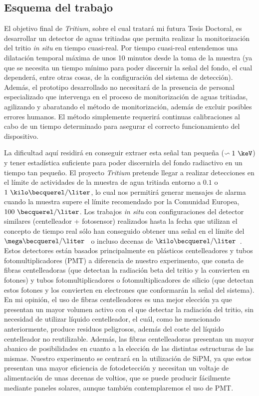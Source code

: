 \subsection{Esquema del trabajo}

El objetivo final de \textit{Tritium}, sobre el cual tratará mi futura Tesis Doctoral, es desarrollar un detector de aguas tritiadas que permita realizar la monitorización del tritio \textit{in situ} en tiempo cuasi-real. Por tiempo cuasi-real entendemos una dilatación temporal máxima de unos 10 minutos desde la toma de la muestra (ya que se necesita un tiempo mínimo para poder discernir la señal del fondo, el cual dependerá, entre otras cosas, de la configuración del sistema de detección). Además, el prototipo desarrollado no necesitará de la presencia de personal especializado que intervenga en el proceso de monitorización de aguas tritiadas, agilizando y abaratando el método de monitorización, además de excluir posibles errores humanos. El método simplemente requerirá continuas calibraciones al cabo de un tiempo determinado para asegurar el correcto funcionamiento del dispositivo. 

La dificultad aquí residirá en conseguir extraer esta señal tan pequeña ($\backsim 1~\keV$) y tener estadística suficiente para poder discernirla del fondo radiactivo en un tiempo tan pequeño. El proyecto \textit{Tritium} pretende llegar a realizar detecciones en el límite de actividades de la muestra de agua tritiada entorno a $0.1$ o $1~\kilo\becquerel/\liter$, lo cual nos permitirá generar mensajes de alarma cuando la muestra supere el límite recomendado por la Comunidad Europea, $100~\becquerel/\liter$. Los trabajos \textit{in situ} con configuraciones del detector similares (centelleador + fotosensor) realizados hasta la fecha que utilizan el concepto de tiempo real sólo han conseguido obtener una señal en el límite del $\mega\becquerel/\liter$~\cite{TesisTritio} o incluso decenas de $\kilo\becquerel/\liter$~\cite{Rat}. Estos detectores están basados principalmente en plásticos centelleadores y tubos fotomultiplicadores (PMT) a diferencia de nuestro experimento, que consta de fibras centelleadoras (que detectan la radiación beta del tritio y la convierten en fotones) y tubos fotomultiplicadores o fotomultiplicadores de silicio (que detectan estos fotones y los convierten en electrones que conformarán la señal del sistema). 
En mi opinión, el uso de fibras centelleadores es una mejor elección ya que presentan un mayor volumen activo con el que detectar la radiación del tritio,  sin necesidad de utilizar líquido centelleador, el cuál, como he mencionado anteriormente, produce residuos peligrosos, además del coste del líquido centelleador no reutilizable. Además, las fibras centelleadoras presentan un mayor abanico de posibilidades en cuanto a la elección de las distintas estructuras de las mismas. Nuestro experimento se centrará en la utilización de SiPM, ya que estos presentan una mayor eficiencia de fotodetección y necesitan un voltaje de alimentación de unas decenas de voltios, que se puede producir fácilmente mediante paneles solares, aunque también contemplaremos el uso de PMT. 

